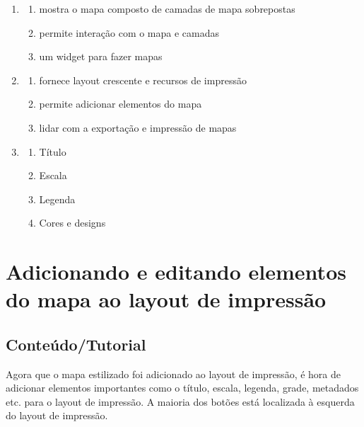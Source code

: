 \documentclass[
  portuguese,
]{krantz}
\providecommand{\tightlist}{%
  \setlength{\itemsep}{0pt}\setlength{\parskip}{0pt}}
\begin{document}
\begin{enumerate}
\def\labelenumi{\arabic{enumi}.}
\item
  \begin{enumerate}
  \def\labelenumii{\alph{enumii}.}
  \tightlist
  \item
    mostra o mapa composto de camadas de mapa sobrepostas
  \item
    permite interação com o mapa e camadas
  \item
    um widget para fazer mapas
  \end{enumerate}
\item
  \begin{enumerate}
  \def\labelenumii{\alph{enumii}.}
  \tightlist
  \item
    fornece layout crescente e recursos de impressão
  \item
    permite adicionar elementos do mapa
  \item
    lidar com a exportação e impressão de mapas
  \end{enumerate}
\item
  \begin{enumerate}
  \def\labelenumii{\alph{enumii}.}
  \tightlist
  \item
    Título
  \item
    Escala
  \item
    Legenda
  \item
    Cores e designs
  \end{enumerate}
\end{enumerate}

\hypertarget{adicionando-e-editando-elementos-do-mapa-ao-layout-de-impressuxe3o}{%
\section{Adicionando e editando elementos do mapa ao layout de impressão}\label{adicionando-e-editando-elementos-do-mapa-ao-layout-de-impressuxe3o}}

\hypertarget{conteuxfadotutorial}{%
\subsection{\texorpdfstring{\textbf{Conteúdo/Tutorial}}{Conteúdo/Tutorial}}\label{conteuxfadotutorial}}

Agora que o mapa estilizado foi adicionado ao layout de impressão, é hora de adicionar elementos importantes como o título, escala, legenda, grade, metadados etc. para o layout de impressão. A maioria dos botões está localizada à esquerda do layout de impressão.
\end{document}
